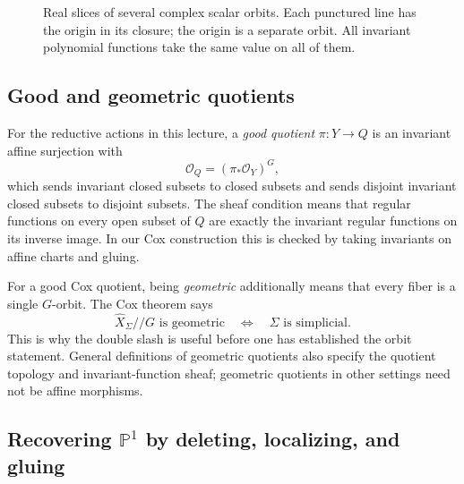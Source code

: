 \documentclass[11pt]{article}
\theoremstyle{definition}
\theoremstyle{remark}
\DeclareMathOperator{\Spec}{Spec}
\newcommand{\A}{\mathbb A}
\newcommand{\Pj}{\mathbb P}
\newcommand{\C}{\mathbb C}
\newcommand{\OO}{\mathcal O}
\begin{document}
\begin{figure}[htbp]
\centering
{}
\caption{Real slices of several complex scalar orbits. Each punctured
line has the origin in its closure; the origin is a separate orbit.
All invariant polynomial functions take the same value on all of them.}
\label{fig:nov02-orbit-closures}
\end{figure}

\subsection{Good and geometric quotients}

For the reductive actions in this lecture, a \emph{good quotient}
\(\pi:Y\to Q\) is an invariant affine surjection with
\[
\OO_Q=(\pi_*\OO_Y)^G,
\]
which sends invariant closed subsets to closed subsets and sends
disjoint invariant closed subsets to disjoint subsets. The sheaf
condition means that regular functions on every open subset of
\(Q\) are exactly the invariant regular functions on its inverse
image. In our Cox construction this is checked by taking invariants
on affine charts and gluing.

For a good Cox quotient, being \emph{geometric} additionally means
that every fiber is a single \(G\)-orbit. The Cox theorem says
\[
\boxed{\widehat X_\Sigma\mathbin{//}G
\text{ is geometric}\quad\Longleftrightarrow\quad
\Sigma\text{ is simplicial}.}
\]
This is why the double slash is useful before one has established
the orbit statement. General definitions of geometric quotients
also specify the quotient topology and invariant-function sheaf;
geometric quotients in other settings need not be affine morphisms.

\subsection{Recovering \texorpdfstring{\(\Pj^1\)}{P1} by deleting, localizing, and gluing}
\end{document}
